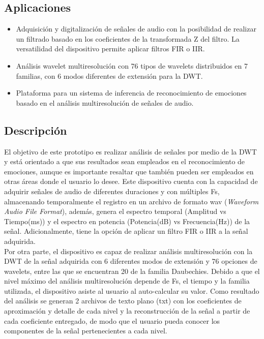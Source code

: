 \documentclass[11pt,lettersize]{article} %
\begin{document}
\subsection{Aplicaciones}
\begin{itemize}
	\item Adquisición y digitalización de señales de audio con la posibilidad de realizar un filtrado basado en los coeficientes de la transformada Z del filtro. La versatilidad del dispositivo permite aplicar filtros FIR o IIR.
	\item Análisis wavelet multiresolución con 76 tipos de wavelets distribuidos en 7 familias, con 6 modos diferentes de extensión para la DWT.
	\item Plataforma para un sistema de inferencia de reconocimiento de emociones basado en el análisis multiresolución de señales de audio.
\end{itemize}

\subsection{Descripción}
El objetivo de este prototipo es realizar análisis de señales por medio de la DWT y está orientado a que sus resultados sean empleados en el reconocimiento de emociones, aunque es importante resaltar que también pueden ser empleados en otras áreas donde el usuario lo desee. Este dispositivo cuenta con la capacidad de adquirir señales de audio de diferentes duraciones y con múltiples Fs, almacenando temporalmente el registro en un archivo de formato wav (\textit{Waveform Audio File Format}), además, genera el espectro temporal (Amplitud vs Tiempo(ms)) y el espectro en potencia (Potencia(dB) vs Frecuencia(Hz)) de la señal. Adicionalmente, tiene la opción de aplicar un filtro FIR o IIR a la señal adquirida. \\

Por otra parte, el dispositivo es capaz de realizar análisis multiresolución con la DWT de la señal adquirida con 6 diferentes modos de extensión y 76 opciones de wavelets, entre las que se encuentran 20 de la familia Daubechies. Debido a que el nivel máximo del análisis multiresolución depende de Fs, el tiempo y la familia utilizada, el dispositivo asiste al usuario al auto-calcular su valor. Como resultado del análisis se generan 2 archivos de texto plano (txt) con los coeficientes de aproximación y detalle de cada nivel y la reconstrucción de la señal a partir de cada coeficiente entregado, de modo que el usuario pueda conocer los componentes de la señal pertenecientes a cada nivel. \\
\end{document}
